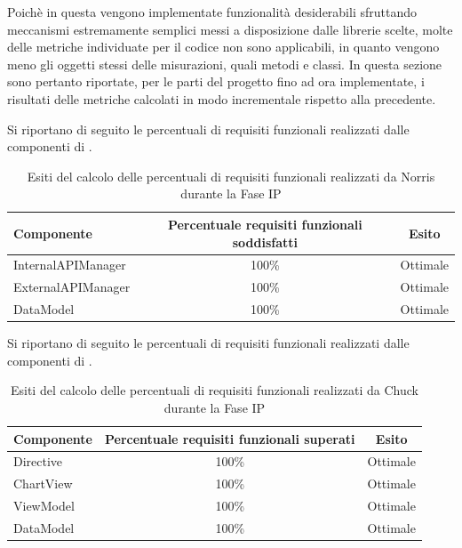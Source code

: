 	Poichè in questa  vengono implementate funzionalità desiderabili sfruttando meccanismi estremamente semplici messi a disposizione dalle librerie scelte, molte delle metriche individuate per il codice non sono applicabili, in quanto vengono meno gli oggetti stessi delle misurazioni, quali metodi e classi.
	In questa sezione sono pertanto riportate, per le parti del progetto fino ad ora implementate, i risultati delle metriche calcolati in modo incrementale rispetto alla  precedente.\\

	Si riportano di seguito le percentuali di requisiti funzionali realizzati dalle componenti di .
	\begin{table}[H]
		\centering
			\begin{tabu}{| l | c | c |}
				\hline
				Componente	& Percentuale requisiti funzionali soddisfatti	& Esito		\\ \hline \hline
				InternalAPIManager	& 100\% 	& Ottimale  \\ \hline
				ExternalAPIManager  & 	100\%	& Ottimale  \\ \hline
				DataModel  & 	100\%	& Ottimale  \\ \hline
			\end{tabu}
		\caption{Esiti del calcolo delle percentuali di requisiti funzionali realizzati da Norris durante la Fase IP}
	\end{table}

	Si riportano di seguito le percentuali di requisiti funzionali realizzati dalle componenti di .
	\begin{table}[H]
		\centering
			\begin{tabu}{| l | c | c |}
				\hline
				Componente	& Percentuale requisiti funzionali superati	& Esito		\\ \hline \hline
				Directive	& 100\% 	& Ottimale  \\ \hline
				ChartView  & 	100\%	& Ottimale  \\ \hline
				ViewModel  & 	100\%	& Ottimale  \\ \hline
				DataModel  & 	100\%	& Ottimale  \\ \hline
			\end{tabu}
		\caption{Esiti del calcolo delle percentuali di requisiti funzionali realizzati da Chuck durante la Fase IP}
	\end{table}

